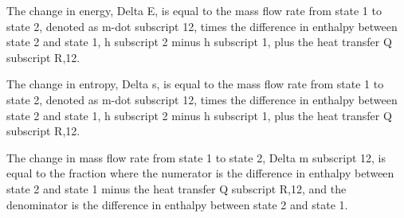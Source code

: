 The change in energy, Delta E, is equal to the mass flow rate from state 1 to state 2, denoted as m-dot subscript 12, times the difference in enthalpy between state 2 and state 1, h subscript 2 minus h subscript 1, plus the heat transfer Q subscript R,12.

The change in entropy, Delta s, is equal to the mass flow rate from state 1 to state 2, denoted as m-dot subscript 12, times the difference in enthalpy between state 2 and state 1, h subscript 2 minus h subscript 1, plus the heat transfer Q subscript R,12.

The change in mass flow rate from state 1 to state 2, Delta m subscript 12, is equal to the fraction where the numerator is the difference in enthalpy between state 2 and state 1 minus the heat transfer Q subscript R,12, and the denominator is the difference in enthalpy between state 2 and state 1.